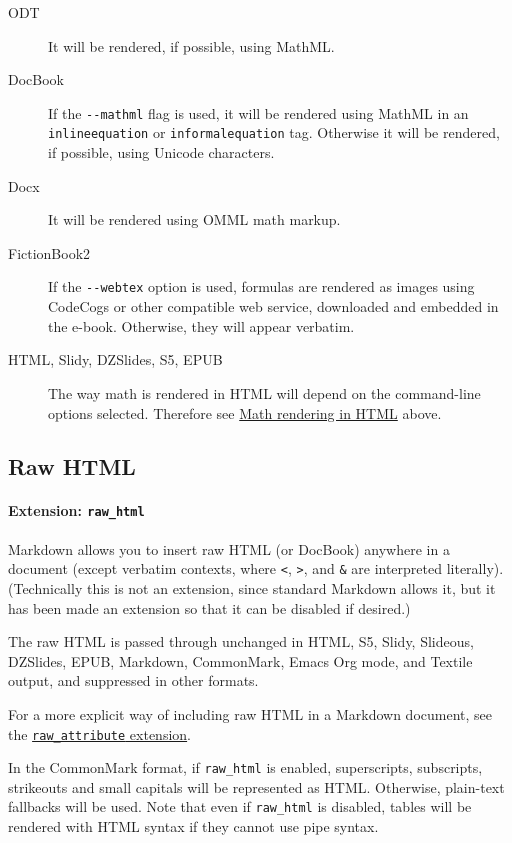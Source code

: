 \documentclass[
  12pt,
  a4paper,
]{article}
\begin{document}
\begin{description}
\item[ODT]
It will be rendered, if possible, using MathML.
\item[DocBook]
If the \texttt{-\/-mathml} flag is used, it will be rendered using MathML in an
\texttt{inlineequation} or \texttt{informalequation} tag. Otherwise it will be rendered, if
possible, using Unicode characters.
\item[Docx]
It will be rendered using OMML math markup.
\item[FictionBook2]
If the \texttt{-\/-webtex} option is used, formulas are rendered as images using CodeCogs or other
compatible web service, downloaded and embedded in the e-book. Otherwise, they will appear
verbatim.
\item[HTML, Slidy, DZSlides, S5, EPUB]
The way math is rendered in HTML will depend on the command-line options selected. Therefore see
\protect\hyperlink{math-rendering-in-html}{Math rendering in HTML} above.
\end{description}

\hypertarget{raw-html}{%
\subsection{Raw HTML}\label{raw-html}}

\hypertarget{extension-raw_html}{%
\paragraph{\texorpdfstring{Extension:
\texttt{raw\_html}}{Extension: raw\_html}}\label{extension-raw_html}}

Markdown allows you to insert raw HTML (or DocBook) anywhere in a document (except verbatim
contexts, where \texttt{\textless{}}, \texttt{\textgreater{}}, and \texttt{\&} are interpreted
literally). (Technically this is not an extension, since standard Markdown allows it, but it has
been made an extension so that it can be disabled if desired.)

The raw HTML is passed through unchanged in HTML, S5, Slidy, Slideous, DZSlides, EPUB, Markdown,
CommonMark, Emacs Org mode, and Textile output, and suppressed in other formats.

For a more explicit way of including raw HTML in a Markdown document, see the
\protect\hyperlink{extension-raw_attribute}{\texttt{raw\_attribute} extension}.

In the CommonMark format, if \texttt{raw\_html} is enabled, superscripts, subscripts, strikeouts
and small capitals will be represented as HTML. Otherwise, plain-text fallbacks will be used. Note
that even if \texttt{raw\_html} is disabled, tables will be rendered with HTML syntax if they
cannot use pipe syntax.
\end{document}

